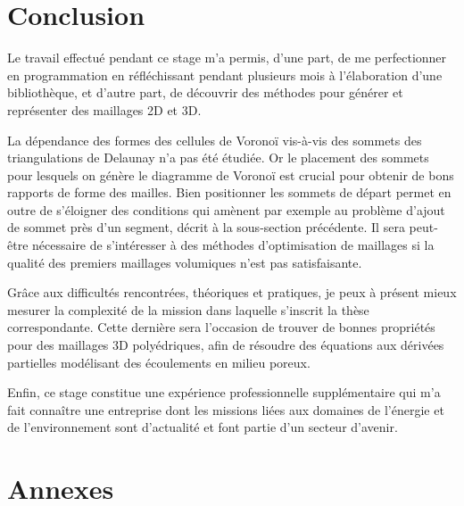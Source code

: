\documentclass[12pt,a4paper]{report}
\begin{document}
\newpage
\section{Conclusion}

Le travail effectué pendant ce stage m'a permis, d'une part, de me perfectionner en programmation en réfléchissant pendant plusieurs mois à l'élaboration d'une bibliothèque, et d'autre part, de découvrir des méthodes pour générer et représenter des maillages 2D et 3D.

La dépendance des formes des cellules de Voronoï vis-à-vis des sommets des triangulations de Delaunay n'a pas été étudiée. Or le placement des sommets pour lesquels on génère le diagramme de Voronoï est crucial pour obtenir de bons rapports de forme des mailles. Bien positionner les sommets de départ permet en outre de s'éloigner des conditions qui amènent par exemple au problème d'ajout de sommet près d'un segment, décrit à la sous-section précédente. Il sera peut-être nécessaire de s'intéresser à des méthodes d'optimisation de maillages si la qualité des premiers maillages volumiques n'est pas satisfaisante.

Grâce aux difficultés rencontrées, théoriques et pratiques, je peux à présent mieux mesurer la complexité de la mission dans laquelle s'inscrit la thèse correspondante. Cette dernière sera l'occasion de trouver de bonnes propriétés pour des maillages 3D polyédriques, afin de résoudre des équations aux dérivées partielles modélisant des écoulements en milieu poreux.

Enfin, ce stage constitue une expérience professionnelle supplémentaire qui m'a fait connaître une entreprise dont les missions liées aux domaines de l'énergie et de l'environnement sont d'actualité et font partie d'un secteur d'avenir.

\newpage
\section{Annexes}
\end{document}
